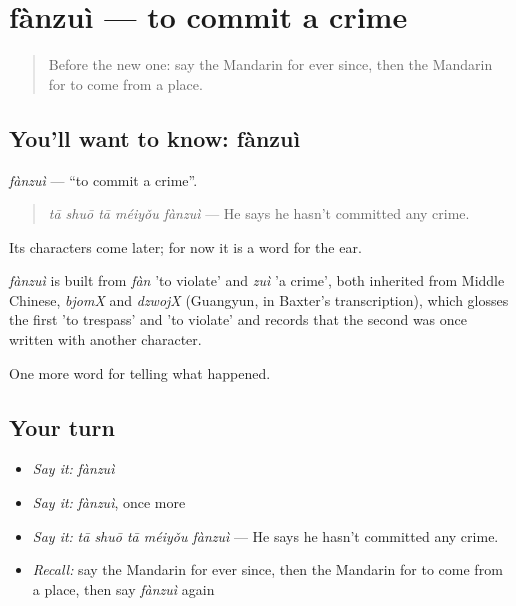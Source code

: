 \section[fànzuì]{fànzuì — to commit a crime}

\label{lesson:ZH-C308-fanzui}



\begin{quote}
Before the new one: say the Mandarin for ever since, then the Mandarin for to come from a place.
\end{quote}

\subsection*{You'll want to know: fànzuì}
\emph{fànzuì} — \textquotedblleft{}to commit a crime\textquotedblright{}.

\begin{quote}
\emph{tā shuō tā méiyǒu fànzuì} — He says he hasn't committed any crime.
\end{quote}

Its characters come later; for now it is a word for the ear.

\begin{cousinweb}
\emph{fànzuì} is built from \emph{fàn} 'to violate' and \emph{zuì} 'a crime', both inherited from Middle Chinese, \emph{bjomX} and \emph{dzwojX} (Guangyun, in Baxter's transcription), which glosses the first 'to trespass' and 'to violate' and records that the second was once written with another character.
\end{cousinweb}

\begin{grammarlens}[title={What you've built}]
One more word for telling what happened.
\end{grammarlens}

\subsection*{Your turn}
\begin{itemize}
\raggedright
  \item \emph{Say it:} \emph{fànzuì}
  \item \emph{Say it:} \emph{fànzuì}, once more
  \item \emph{Say it:} \emph{tā shuō tā méiyǒu fànzuì} — He says he hasn't committed any crime.
  \item \emph{Recall:} say the Mandarin for ever since, then the Mandarin for to come from a place, then say \emph{fànzuì} again
\end{itemize}

